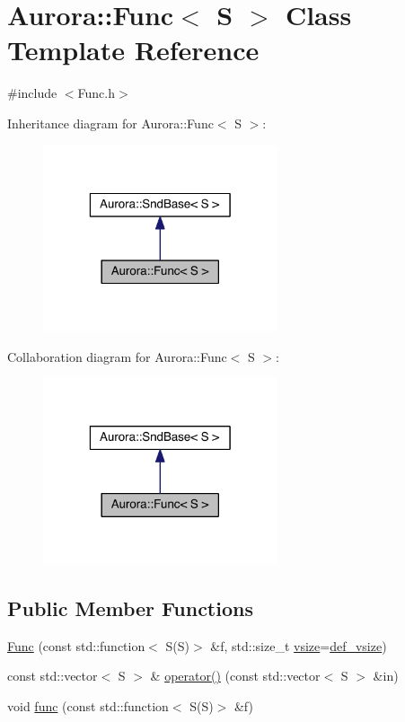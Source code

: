 \hypertarget{class_aurora_1_1_func}{}\section{Aurora\+:\+:Func$<$ S $>$ Class Template Reference}
\label{class_aurora_1_1_func}


{\ttfamily \#include $<$Func.\+h$>$}



Inheritance diagram for Aurora\+:\+:Func$<$ S $>$\+:\nopagebreak
\begin{figure}[H]
\begin{center}
\leavevmode
\includegraphics[width=196pt]{class_aurora_1_1_func__inherit__graph}
\end{center}
\end{figure}


Collaboration diagram for Aurora\+:\+:Func$<$ S $>$\+:\nopagebreak
\begin{figure}[H]
\begin{center}
\leavevmode
\includegraphics[width=196pt]{class_aurora_1_1_func__coll__graph}
\end{center}
\end{figure}
\subsection*{Public Member Functions}
\begin{DoxyCompactItemize}
\item 
\hyperlink{class_aurora_1_1_func_a87eaf7fa6fffaa73ed7a87e62138afc8}{Func} (const std\+::function$<$ S(S)$>$ \&f, std\+::size\+\_\+t \hyperlink{class_aurora_1_1_snd_base_af9e21aaf411b17f7a8221c991ce5d291}{vsize}=\hyperlink{namespace_aurora_afaaddf667a06e7ce23c667a8b7295263}{def\+\_\+vsize})
\item 
const std\+::vector$<$ S $>$ \& \hyperlink{class_aurora_1_1_func_a60e9dad421d80a9f9eb99cfbac104729}{operator()} (const std\+::vector$<$ S $>$ \&in)
\item 
void \hyperlink{class_aurora_1_1_func_a3e5734a709e472de5b5cbc1f8bfdf371}{func} (const std\+::function$<$ S(S)$>$ \&f)
\end{DoxyCompactItemize}
